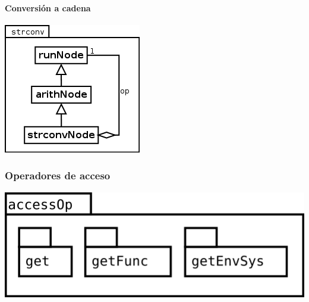 \paragraph {Conversión a cadena}
\begin{center}
\includegraphics[scale=0.4]{strconv.png} \\
\end{center}

\pagebreak
\subsubsection {Operadores de acceso}
\begin{center}
\includegraphics[scale=0.4]{accessOp-package.png} \\
\end{center}

